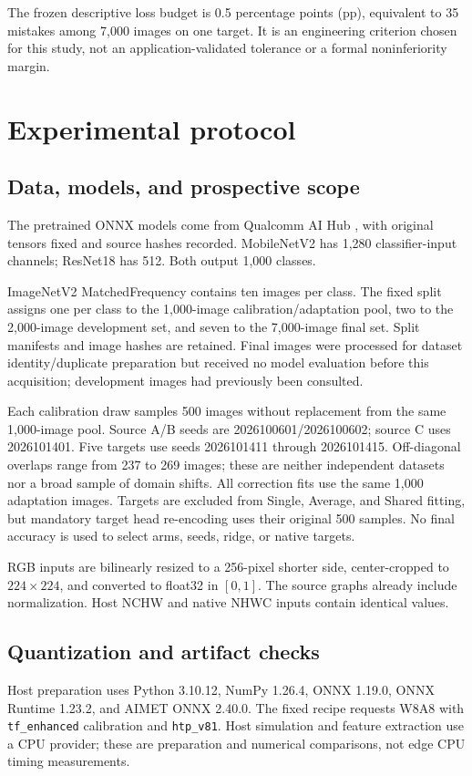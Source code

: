 \documentclass[10pt,twocolumn]{article}
\begin{document}
The frozen descriptive loss budget is 0.5 percentage points (pp), equivalent to 35 mistakes among 7,000 images on one target. It is an engineering criterion chosen for this study, not an application-validated tolerance or a formal noninferiority margin.

\section{Experimental protocol}
\subsection{Data, models, and prospective scope}
The pretrained ONNX models come from Qualcomm AI Hub \citep{qaihub}, with original tensors fixed and source hashes recorded. MobileNetV2 \citep{sandler2018} has 1,280 classifier-input channels; ResNet18 \citep{he2016} has 512. Both output 1,000 classes.

ImageNetV2 MatchedFrequency \citep{recht2019} contains ten images per class. The fixed split assigns one per class to the 1,000-image calibration/adaptation pool, two to the 2,000-image development set, and seven to the 7,000-image final set. Split manifests and image hashes are retained. Final images were processed for dataset identity/duplicate preparation but received no model evaluation before this acquisition; development images had previously been consulted.

Each calibration draw samples 500 images without replacement from the same 1,000-image pool. Source A/B seeds are 2026100601/2026100602; source C uses 2026101401. Five targets use seeds 2026101411 through 2026101415. Off-diagonal overlaps range from 237 to 269 images; these are neither independent datasets nor a broad sample of domain shifts. All correction fits use the same 1,000 adaptation images. Targets are excluded from Single, Average, and Shared fitting, but mandatory target head re-encoding uses their original 500 samples. No final accuracy is used to select arms, seeds, ridge, or native targets.

RGB inputs are bilinearly resized to a 256-pixel shorter side, center-cropped to $224\times224$, and converted to float32 in $[0,1]$. The source graphs already include normalization. Host NCHW and native NHWC inputs contain identical values.

\subsection{Quantization and artifact checks}
Host preparation uses Python 3.10.12, NumPy 1.26.4, ONNX 1.19.0, ONNX Runtime 1.23.2, and AIMET ONNX 2.40.0. The fixed recipe requests W8A8 with \texttt{tf\_enhanced} calibration and \texttt{htp\_v81}. Host simulation and feature extraction use a CPU provider; these are preparation and numerical comparisons, not edge CPU timing measurements.
\end{document}
